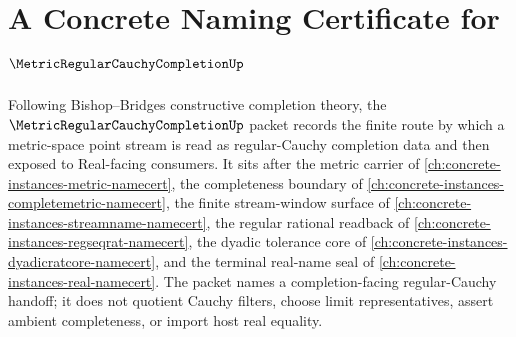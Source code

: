 \chapter{A Concrete Naming Certificate for $\MetricRegularCauchyCompletionUp$}
\label{ch:concrete-instances-metric-regular-cauchy-completion-namecert}

Following Bishop--Bridges constructive completion theory, the $\MetricRegularCauchyCompletionUp$ packet records the finite route by which a metric-space point stream is read as regular-Cauchy completion data and then exposed to Real-facing consumers. It sits after the metric carrier of \autoref{ch:concrete-instances-metric-namecert}, the completeness boundary of \autoref{ch:concrete-instances-completemetric-namecert}, the finite stream-window surface of \autoref{ch:concrete-instances-streamname-namecert}, the regular rational readback of \autoref{ch:concrete-instances-regseqrat-namecert}, the dyadic tolerance core of \autoref{ch:concrete-instances-dyadicratcore-namecert}, and the terminal real-name seal of \autoref{ch:concrete-instances-real-namecert}. The packet names a completion-facing regular-Cauchy handoff; it does not quotient Cauchy filters, choose limit representatives, assert ambient completeness, or import host real equality.

